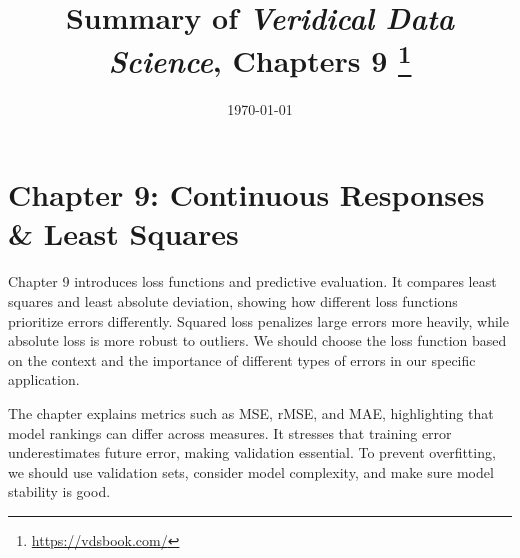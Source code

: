 \documentclass[letterpaper, 11pt]{article}
\title{\vspace{-1.5cm} Summary of \textit{Veridical Data Science}, Chapters 9 \footnote{\url{https://vdsbook.com/}}}
\date{\today}
\begin{document}
\hypersetup{colorlinks=true, linkcolor=blue, urlcolor=blue}
\maketitle

\section*{Chapter 9: Continuous Responses \& Least Squares}

Chapter 9 introduces loss functions and predictive evaluation.
It compares least squares and least absolute deviation, showing how different loss functions prioritize errors differently.
Squared loss penalizes large errors more heavily, while absolute loss is more robust to outliers.
We should choose the loss function based on the context and the importance of different types of errors in our specific application.

The chapter explains metrics such as MSE, rMSE, and MAE, highlighting that model rankings can differ across measures.
It stresses that training error underestimates future error, making validation essential.
To prevent overfitting, we should use validation sets, consider model complexity, and make sure model stability is good.
\end{document}

